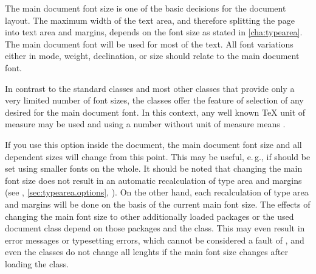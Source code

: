 The main document font size is one of the basic decisions for the document
layout. The maximum width of the text area, and therefore splitting the page
into text area and margins, depends on the font size as stated in
\autoref{cha:typearea}. The main document font will be used for most 
of the text. All font variations either in mode, weight, declination, or size
should relate to the main document font.


\begin{Declaration}
\end{Declaration}
In contrast to the standard classes and most other classes that provide only
a very limited number of font sizes, the \KOMAScript{} classes offer the
feature of selection of any desired  for the main document
font. In this context, any well known \TeX{} unit of measure may be used and
using a number without unit of measure means .

If you use this option inside the document, the main document font size and
all dependent sizes will change from this point. This may be useful, e.\,g.,
if %
should be set using smaller fonts on the whole. It should be noted that
changing the main font size does not result in an automatic recalculation of
type area and margins (see
,
\autoref{sec:typearea.options},
). On the other hand, each
recalculation of type area and margins will be done on the basis of the
current main font size. The effects of changing the main font size to other
additionally loaded packages or the used document class depend on those
packages and the class. This may even result in error messages or typesetting
errors, which cannot be considered a fault of \KOMAScript, and even the
\KOMAScript{} classes do not change all lenghts if the main font size changes
after loading the class.

